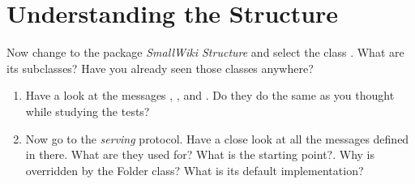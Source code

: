 \section{Understanding the Structure}
\exercise Now change to the package \textit{SmallWiki Structure} and select the class . What are its subclasses? Have you already seen those classes anywhere?
\begin{enumerate}
\item Have a look at the messages ,
,  and
. Do they do the same as you thought
while studying the tests? \item Now go to the \textit{serving}
protocol. Have a close look at all the messages defined in there.
What are they used for? What is the starting point?. Why is
 overridden by the Folder class?
What is its default implementation?
\end{enumerate}

\ifx\wholebook\relax\else\fi
